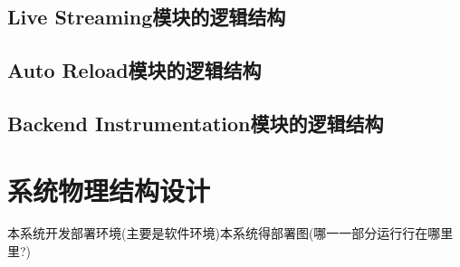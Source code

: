 \subsection{Live Streaming模块的逻辑结构}



\subsection{Auto Reload模块的逻辑结构}

\subsection{Backend Instrumentation模块的逻辑结构}

\section{系统物理结构设计}
本系统开发部署环境(主要是软件环境)本系统得部署图(哪⼀一部分运⾏行在哪⾥里?)













